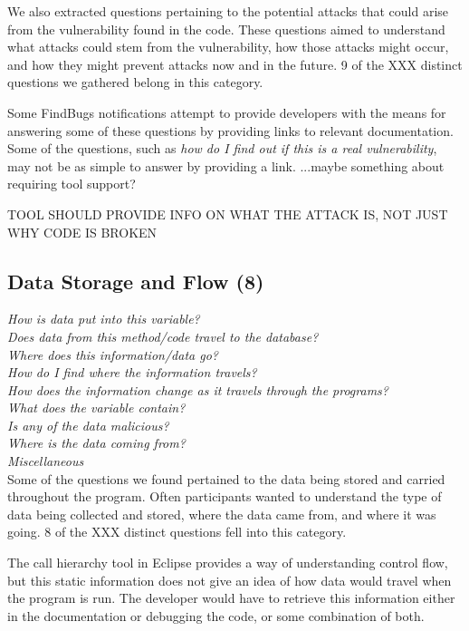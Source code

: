 \documentclass[conference]{IEEEtran}
\begin{document}
We also extracted questions pertaining to the potential attacks that could arise from the vulnerability found in the code. These questions aimed to understand what attacks could stem from the vulnerability, how those attacks might occur, and how they might prevent attacks now and in the future. 9 of the XXX distinct questions we gathered belong in this category.

Some FindBugs notifications attempt to provide developers with the means for answering some of these questions by providing links to relevant documentation. Some of the questions, such as \emph{how do I find out if this is a real vulnerability}, may not be as simple to answer by providing a link. ...maybe something about requiring tool support?

TOOL SHOULD PROVIDE INFO ON WHAT THE ATTACK IS, NOT JUST WHY CODE IS BROKEN


\noindent\subsection{\textbf{Data Storage and Flow (8)}}

\noindent\emph{How is data put into this variable?} \\
\emph{Does data from this method/code travel to the database?} \\
\emph{Where does this information/data go?} \\
\emph{How do I find where the information travels?} \\
\emph{How does the information change as it travels through the programs?} \\
\emph{What does the variable contain?} \\
\emph{Is any of the data malicious?} \\
\emph{Where is the data coming from?} \\
\emph{Miscellaneous} \\

Some of the questions we found pertained to the data being stored and carried throughout the program. Often participants wanted to understand  the type of data being collected and stored, where the data came from, and where it was going. 8 of the XXX distinct questions fell into this category.

The call hierarchy tool in Eclipse provides a way of understanding control flow, but this static information does not give an idea of how data would travel when the program is run. The developer would have to retrieve this information either in the documentation or debugging the code, or some combination of both.
\end{document}
